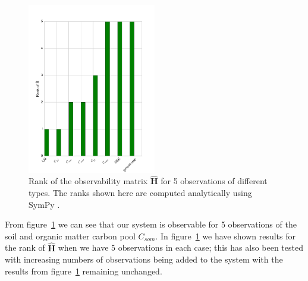\documentclass[11pt]{article}
\begin{document}
\begin{figure}[ht]
    \centering
    \includegraphics[width=0.5\textwidth]{dalec1_obsrank.pdf}
    \caption{Rank of the observability matrix $\hat{\textbf{H}}$ for 5 observations of different types. The ranks shown here are computed analytically using SymPy \citep{Joyner:2012:OSC:2110170.2110185}.}
    \label{fig:D1_observability}
\end{figure}

From figure~\ref{fig:D1_observability} we can see that our system is observable for 5 observations of the soil and organic matter carbon pool $C_{som}$. In figure~\ref{fig:D1_observability} we have shown results for the rank of  $\hat{\textbf{H}}$ when we have 5 observations in each case; this has also been tested with increasing numbers of observations being added to the system with the results from figure~\ref{fig:D1_observability} remaining unchanged. 
\end{document}
